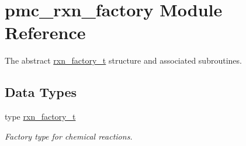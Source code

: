\hypertarget{namespacepmc__rxn__factory}{}\section{pmc\+\_\+rxn\+\_\+factory Module Reference}
\label{namespacepmc__rxn__factory}


The abstract \mbox{\hyperlink{structpmc__rxn__factory_1_1rxn__factory__t}{rxn\+\_\+factory\+\_\+t}} structure and associated subroutines.  


\subsection*{Data Types}
\begin{DoxyCompactItemize}
\item 
type \mbox{\hyperlink{structpmc__rxn__factory_1_1rxn__factory__t}{rxn\+\_\+factory\+\_\+t}}
\begin{DoxyCompactList}\small\item\em Factory type for chemical reactions. \end{DoxyCompactList}\end{DoxyCompactItemize}
